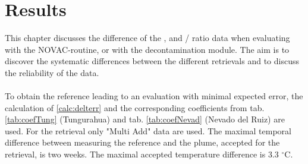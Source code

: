 \documentclass  [
  paper    = a4,
  BCOR     = 10mm,
  twoside,
  fontsize = 12pt,
  fleqn,
  toc      = bibnumbered,
  toc      = listofnumbered,
  numbers  = noendperiod,
  headings = normal,
  listof   = leveldown,
  version  = 3.03
]                                       {scrreprt}
\begin{document}
	
	
	

	
	\chapter{Results}
	This chapter discusses the difference of the ,  and /  ratio data when evaluating with the NOVAC-routine, or with the decontamination module.
	The aim is to discover the systematic differences between the different retrievals and to discuss the reliability of the data.\\
	\\
	To obtain the reference leading to an evaluation with minimal expected   error, the calculation of \cref{calc:delterr} and the corresponding coefficients from tab. \ref{tab:coefTung} (Tungurahua) and tab. \ref{tab:coefNevad} (Nevado del Ruiz) are used. 
	For the retrieval only "Multi Add" data are used. The maximal temporal difference between measuring the reference and the plume, accepted for the retrieval, is two weeks. The maximal accepted temperature difference is 3.3 $^{\circ}$C.\\
	\\
\end{document}
